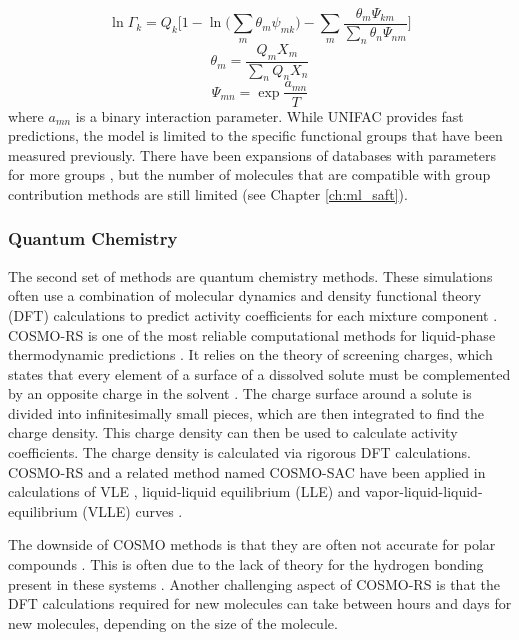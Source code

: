 \begin{equation}
    \ln \Gamma_k = Q_k \biggl[1 - \ln \bigl(\sum_m \theta_m \psi_{mk}\bigr) - \sum_m \frac{\theta_m \Psi_{km}}{\sum_n \theta_n \Psi_{nm}} \biggr]
\end{equation}
\begin{equation}
    \theta_m = \frac{Q_m X_m}{\sum_n Q_n X_n}
\end{equation}
\begin{equation}
    \Psi_{mn} = \exp{\frac{a_{mn}}{T}}
\end{equation}
where $a_{mn}$ is a binary interaction parameter. While UNIFAC provides fast predictions, the model is limited to the specific functional groups that have been measured previously. There have been expansions of databases with parameters for more groups \cite{Joback1987, Constantinou1994, Constantinescu2016}, but the number of molecules that are compatible with  group contribution methods are still limited (see Chapter \ref{ch:ml_saft}).

\subsubsection{Quantum Chemistry}

The second set of methods are quantum chemistry methods. These simulations often use a combination of molecular dynamics and density functional theory (DFT) calculations to predict activity coefficients for each mixture component \cite{Constantinescu2005}. COSMO-RS is one of the most reliable computational methods for liquid-phase thermodynamic predictions \cite{Klamt1995, Klamt2010}. It relies on the theory of screening charges, which states that every element of a surface of a dissolved solute must be complemented by an opposite charge in the solvent  \cite{Klamt1995}. The charge surface around a solute is divided into infinitesimally small pieces, which are then integrated to find the charge density. This charge density can then be used to calculate activity coefficients. The charge density is calculated via rigorous DFT calculations. COSMO-RS and a related method named COSMO-SAC have been applied in calculations of VLE \cite{Constantinescu2005}, liquid-liquid equilibrium (LLE) \cite{Dechambre2014} and vapor-liquid-liquid-equilibrium (VLLE) curves \cite{Kundu2011}.

The downside of COSMO methods is that they are often not accurate for polar compounds \cite{Constantinescu2005, Kundu2011}. This is often due to the lack of theory for the hydrogen bonding present in these systems \cite{Kundu2011}. Another challenging aspect of COSMO-RS is  that the DFT calculations required for new molecules can take between hours and days for new molecules, depending on the size of the molecule.

